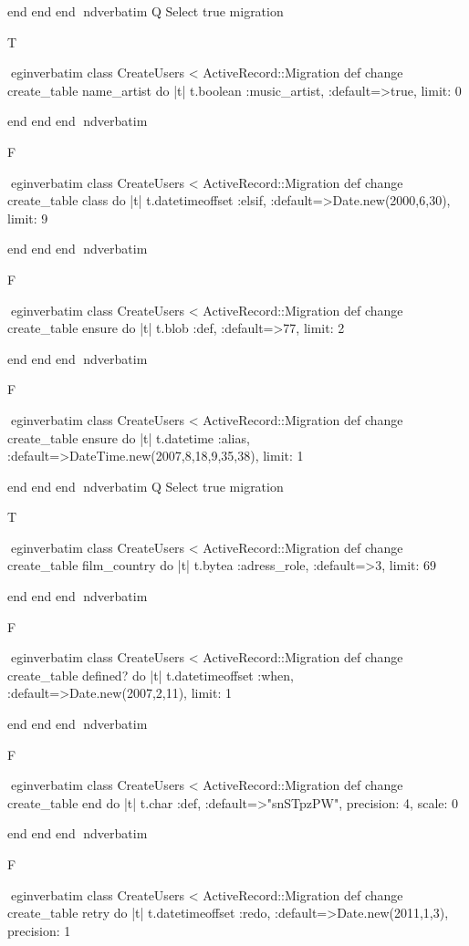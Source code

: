     end 
  end 
end
nd{verbatim}
Q
 Select true migration

T

egin{verbatim}
 class CreateUsers < ActiveRecord::Migration 
  def change 
    create_table name_artist do |t| 
      t.boolean :music_artist, :default=>true, limit: 0
    
    end 
  end 
end
nd{verbatim}

F

egin{verbatim}
 class CreateUsers < ActiveRecord::Migration 
  def change 
    create_table class do |t| 
      t.datetimeoffset :elsif, :default=>Date.new(2000,6,30), limit: 9
    
    end 
  end 
end
nd{verbatim}

F

egin{verbatim}
 class CreateUsers < ActiveRecord::Migration 
  def change 
    create_table ensure do |t| 
      t.blob :def, :default=>77, limit: 2
    
    end 
  end 
end
nd{verbatim}

F

egin{verbatim}
 class CreateUsers < ActiveRecord::Migration 
  def change 
    create_table ensure do |t| 
      t.datetime :alias, :default=>DateTime.new(2007,8,18,9,35,38), limit: 1
    
    end 
  end 
end
nd{verbatim}
Q
 Select true migration

T

egin{verbatim}
 class CreateUsers < ActiveRecord::Migration 
  def change 
    create_table film_country do |t| 
      t.bytea :adress_role, :default=>3, limit: 69
    
    end 
  end 
end
nd{verbatim}

F

egin{verbatim}
 class CreateUsers < ActiveRecord::Migration 
  def change 
    create_table defined? do |t| 
      t.datetimeoffset :when, :default=>Date.new(2007,2,11), limit: 1
    
    end 
  end 
end
nd{verbatim}

F

egin{verbatim}
 class CreateUsers < ActiveRecord::Migration 
  def change 
    create_table end do |t| 
      t.char :def, :default=>"snSTpzPW", precision: 4, scale: 0
    
    end 
  end 
end
nd{verbatim}

F

egin{verbatim}
 class CreateUsers < ActiveRecord::Migration 
  def change 
    create_table retry do |t| 
      t.datetimeoffset :redo, :default=>Date.new(2011,1,3), precision: 1
    
